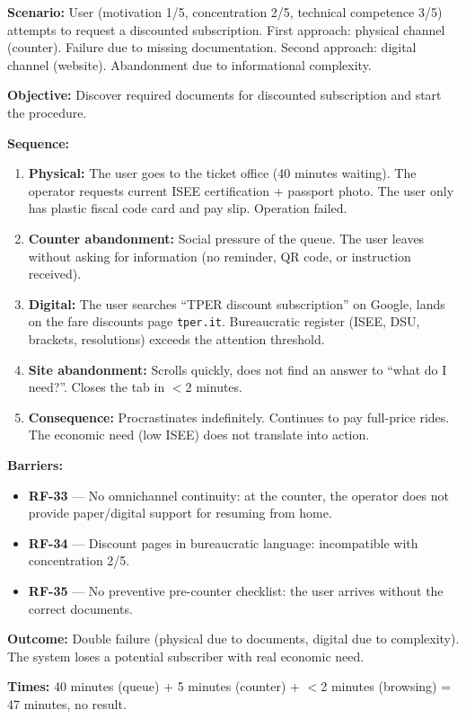 ﻿\documentclass[11pt,a4paper]{article}
\begin{document}
\begin{tcolorbox}[base]
    {\small
    \textbf{Scenario:} User (motivation 1/5, concentration 2/5, technical competence 3/5) attempts to request a discounted subscription. First approach: physical channel (counter). Failure due to missing documentation. Second approach: digital channel (website). Abandonment due to informational complexity.

    \textbf{Objective:} Discover required documents for discounted subscription and start the procedure.

    \textbf{Sequence:}
    \begin{enumerate}
        \item \textbf{Physical:} The user goes to the ticket office (40 minutes waiting). The operator requests current ISEE certification + passport photo. The user only has plastic fiscal code card and pay slip. Operation failed.
        \item \textbf{Counter abandonment:} Social pressure of the queue. The user leaves without asking for information (no reminder, QR code, or instruction received).
        \item \textbf{Digital:} The user searches ``TPER discount subscription'' on Google, lands on the fare discounts page \texttt{tper.it}. Bureaucratic register (ISEE, DSU, brackets, resolutions) exceeds the attention threshold.
        \item \textbf{Site abandonment:} Scrolls quickly, does not find an answer to ``what do I need?''. Closes the tab in $<$2 minutes.
        \item \textbf{Consequence:} Procrastinates indefinitely. Continues to pay full-price rides. The economic need (low ISEE) does not translate into action.
    \end{enumerate}

    \textbf{Barriers:}
    \begin{itemize}
        \item \textbf{RF-33} --- No omnichannel continuity: at the counter, the operator does not provide paper/digital support for resuming from home.
        \item \textbf{RF-34} --- Discount pages in bureaucratic language: incompatible with concentration 2/5.
        \item \textbf{RF-35} --- No preventive pre-counter checklist: the user arrives without the correct documents.
    \end{itemize}

    \textbf{Outcome:} Double failure (physical due to documents, digital due to complexity). The system loses a potential subscriber with real economic need.

    \textbf{Times:} 40 minutes (queue) + 5 minutes (counter) + $<$2 minutes (browsing) = 47 minutes, no result.
    }
\end{tcolorbox}
\end{document}
